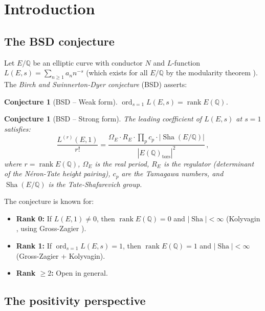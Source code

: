 \documentclass[aps,prd,twocolumn,superscriptaddress,nofootinbib]{revtex4-2}
\newtheorem{conjecture}[theorem]{Conjecture}
\theoremstyle{definition}
\theoremstyle{remark}
\DeclareMathOperator{\ord}{ord}
\DeclareMathOperator{\rank}{rank}
\DeclareMathOperator{\Sha}{Sha}
\begin{document}
\section{Introduction}
\label{sec:intro}

\subsection{The BSD conjecture}

Let $E/\mathbb{Q}$ be an elliptic curve with conductor $N$ and $L$-function $L(E,s) = \sum_{n \geq 1} a_n n^{-s}$ (which exists for all $E/\mathbb{Q}$ by the modularity theorem \cite{Wiles1995}). The \textit{Birch and Swinnerton-Dyer conjecture} (BSD) \cite{BSD1965} asserts:

\begin{conjecture}[BSD -- Weak form]
\label{conj:bsd_weak}
$\ord_{s=1} L(E,s) = \rank E(\mathbb{Q})$.
\end{conjecture}

\begin{conjecture}[BSD -- Strong form]
\label{conj:bsd_strong}
The leading coefficient of $L(E,s)$ at $s = 1$ satisfies:
\begin{equation}
\frac{L^{(r)}(E,1)}{r!} = \frac{\Omega_E \cdot R_E \cdot \prod_p c_p \cdot |\Sha(E/\mathbb{Q})|}{|E(\mathbb{Q})_{\mathrm{tors}}|^2}\,,
\label{eq:bsd_formula}
\end{equation}
where $r = \rank E(\mathbb{Q})$, $\Omega_E$ is the real period, $R_E$ is the regulator (determinant of the N\'eron-Tate height pairing), $c_p$ are the Tamagawa numbers, and $\Sha(E/\mathbb{Q})$ is the Tate-Shafarevich group.
\end{conjecture}

The conjecture is known for:
\begin{itemize}
\item \textbf{Rank 0:} If $L(E,1) \neq 0$, then $\rank E(\mathbb{Q}) = 0$ and $|\Sha| < \infty$ (Kolyvagin \cite{Kolyvagin1990}, using Gross-Zagier \cite{GrossZagier1986}).
\item \textbf{Rank 1:} If $\ord_{s=1} L(E,s) = 1$, then $\rank E(\mathbb{Q}) = 1$ and $|\Sha| < \infty$ (Gross-Zagier + Kolyvagin).
\item \textbf{Rank $\geq 2$:} Open in general.
\end{itemize}

\subsection{The positivity perspective}
\end{document}
